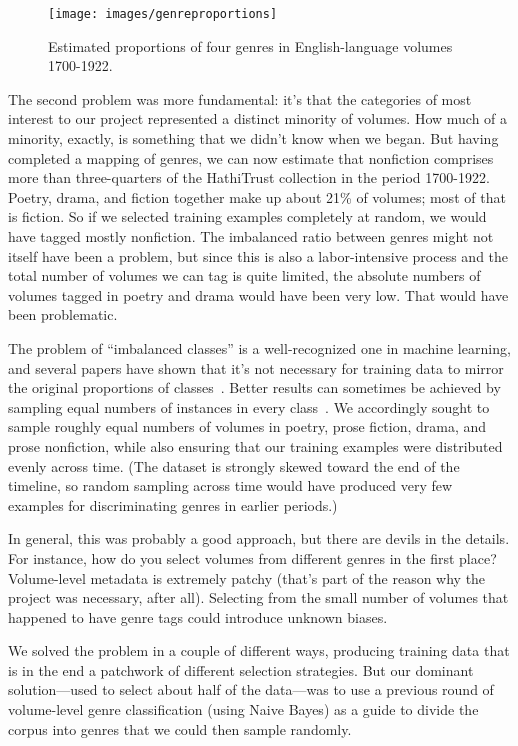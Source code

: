 \documentclass[paper=a4, fontsize=12pt]{scrartcl}
\numberwithin{equation}{section}		%
\numberwithin{figure}{section}			%
\numberwithin{table}{section}				%
\begin{document}
\begin{figure}[!h]
\centering
\texttt{[image: images/genreproportions]}
\caption{Estimated proportions of four genres in English-language volumes 1700-1922.}
\label{genreproportions}
\end{figure}

The second problem was more fundamental: it's that the categories of most interest to our project represented a distinct minority of volumes. How much of a minority, exactly, is something that we didn't know when we began. But having completed a mapping of genres, we can now estimate that nonfiction comprises more than three-quarters of the HathiTrust collection in the period 1700-1922. Poetry, drama, and fiction together make up about 21\% of volumes; most of that is fiction. So if we selected training examples completely at random, we would have tagged mostly nonfiction. The imbalanced ratio between genres might not itself have been a problem, but since this is also a labor-intensive process and the total number of volumes we can tag is quite limited, the absolute numbers of volumes tagged in poetry and drama would have been very low. That would have been problematic.

The problem of ``imbalanced classes'' is a well-recognized one in machine learning, and several papers have shown that it's not necessary for training data to mirror the original proportions of classes~\cite{japkowicz:imbalance}. Better results can sometimes be achieved by sampling equal numbers of instances in every class~\cite{weiss:imbalance}. We accordingly sought to sample roughly equal numbers of volumes in poetry, prose fiction, drama, and prose nonfiction, while also ensuring that our training examples were distributed evenly across time. (The dataset is strongly skewed toward the end of the timeline, so random sampling across time would have produced very few examples for discriminating genres in earlier periods.)

In general, this was probably a good approach, but there are devils in the details. For instance, how do you select volumes from different genres in the first place? Volume-level metadata is extremely patchy (that's part of the reason why the project was necessary, after all). Selecting from the small number of volumes that happened to have genre tags could introduce unknown biases.

We solved the problem in a couple of different ways, producing training data that is in the end a patchwork of different selection strategies. But our dominant solution---used to select about half of the data---was to use a previous round of volume-level genre classification (using Naive Bayes) as a guide to divide the corpus into genres that we could then sample randomly. 
\end{document}
